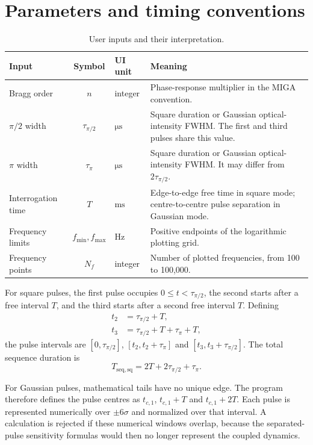 \documentclass[11pt,a4paper]{article}
\newcommand{\tauhalf}{\tau_{\pi/2}}
\newcommand{\taupi}{\tau_{\pi}}
\begin{document}
\section{Parameters and timing conventions}\label{sec:timing}

\begin{table}[H]
\centering
\caption{User inputs and their interpretation.}
\label{tab:inputs}
\begin{tabularx}{\textwidth}{@{}lclX@{}}
\toprule
Input & Symbol & UI unit & Meaning \\
\midrule
Bragg order & $n$ & integer & Phase-response multiplier in the MIGA convention. \\
$\pi/2$ width & $\tauhalf$ & $\si{\micro\second}$ & Square duration or Gaussian optical-intensity FWHM. The first and third pulses share this value. \\
$\pi$ width & $\taupi$ & $\si{\micro\second}$ & Square duration or Gaussian optical-intensity FWHM. It may differ from $2\tauhalf$. \\
Interrogation time & $T$ & $\si{\milli\second}$ & Edge-to-edge free time in square mode; centre-to-centre pulse separation in Gaussian mode. \\
Frequency limits & $f_{\min},f_{\max}$ & $\si{\hertz}$ & Positive endpoints of the logarithmic plotting grid. \\
Frequency points & $N_f$ & integer & Number of plotted frequencies, from 100 to 100,000. \\
\bottomrule
\end{tabularx}
\end{table}

For square pulses, the first pulse occupies $0\leq t<\tauhalf$, the second starts after a free interval $T$, and the third starts after a second free interval $T$. Defining
\begin{align}
t_2 &= \tauhalf+T,\\
t_3 &= \tauhalf+T+\taupi+T,
\end{align}
the pulse intervals are $[0,\tauhalf]$, $[t_2,t_2+\taupi]$ and $[t_3,t_3+\tauhalf]$. The total sequence duration is
\begin{equation}
T_{\mathrm{seq,sq}}=2T+2\tauhalf+\taupi.
\end{equation}

For Gaussian pulses, mathematical tails have no unique edge. The program therefore defines the pulse centres as $t_{c,1}$, $t_{c,1}+T$ and $t_{c,1}+2T$. Each pulse is represented numerically over $\pm6\sigma$ and normalized over that interval. A calculation is rejected if these numerical windows overlap, because the separated-pulse sensitivity formulas would then no longer represent the coupled dynamics.
\end{document}
